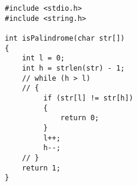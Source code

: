 
\begin{lstlisting}[style=CStyle, caption=Mutant M7 of function isPalindrome., label=isPalindrome_m7]
#include <stdio.h> 
#include <string.h> 

int isPalindrome(char str[]) 
{ 
    int l = 0; 
    int h = strlen(str) - 1; 
    // while (h > l) 
    // { 
         if (str[l] != str[h]) 
         { 
             return 0;
         } 
         l++;
         h--;
    // } 
    return 1; 
} 
\end{lstlisting}